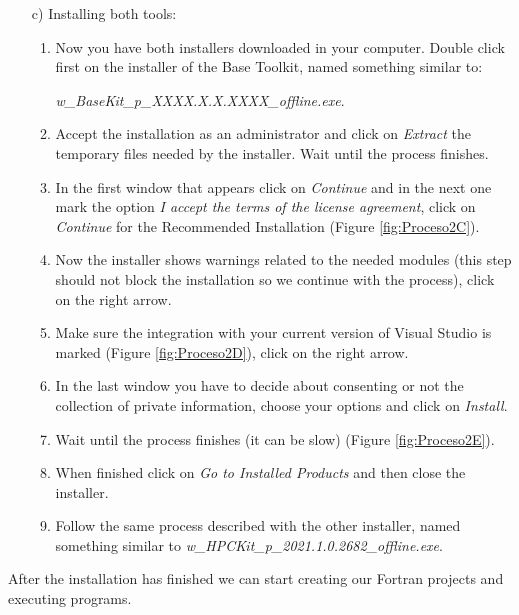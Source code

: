 \begin{itemize}
    \item[c)] Installing both tools:
    \begin{enumerate}
        \item Now you have both installers downloaded in your computer. Double click first on the installer of the Base Toolkit, named something similar to:
        
         \textit{w\_BaseKit\_p\_XXXX.X.X.XXXX\_offline.exe}.
        \item Accept the installation as an administrator and click on \textit{Extract} the temporary files needed by the installer. Wait until the process finishes. 
        \item In the first window that appears click on \textit{Continue} and in the next one mark the option \textit{I accept the terms of the license agreement}, click on \textit{Continue} for the Recommended Installation (Figure \ref{fig:Proceso2C}). 
        \item Now the installer shows warnings related to the needed modules (this step should not block the installation so we continue with the process), click on the right arrow. 
        \item Make sure the integration with your current version of Visual Studio is marked (Figure \ref{fig:Proceso2D}), click on the right arrow.
        \item In the last window you have to decide about consenting or not the collection of private information, choose your options and click on \textit{Install}.
        \item Wait until the process finishes (it can be slow) (Figure \ref{fig:Proceso2E}). 
        \item When finished click on \textit{Go to Installed Products} and then close the installer. 
        \item Follow the same process described with the other installer, named something similar to \textit{w\_HPCKit\_p\_2021.1.0.2682\_offline.exe}.
    \end{enumerate}
\end{itemize}

After the installation has finished we can start creating our Fortran projects and executing programs.

